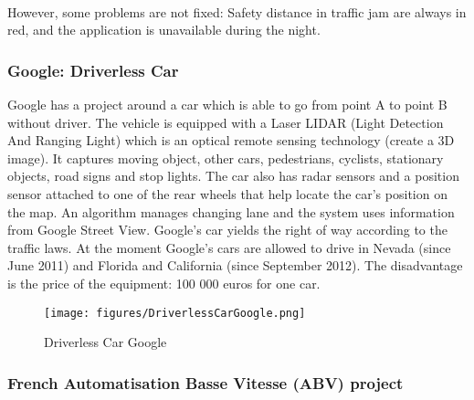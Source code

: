 \documentclass[a4paper]{article}
\begin{document}
\paragraph{}However, some problems are not fixed: Safety distance in traffic jam are always in red, and the application is unavailable during the night.

\subsubsection{Google: Driverless Car}

Google \cite{Google} has a project around a car which is able to go from point A to point B without driver. The vehicle is equipped with a Laser LIDAR (Light Detection And Ranging Light) which is an optical remote sensing technology (create a 3D image). It captures moving object, other cars, pedestrians, cyclists, stationary objects, road signs and stop lights. The car also has radar sensors and a position sensor attached to one of the rear wheels that help locate the car's position on the map. An algorithm manages changing lane and the system uses information from Google Street View. Google's car yields the right of way according to the traffic laws. At the moment Google's cars are allowed to drive in Nevada (since June 2011) and Florida and California (since September 2012). The disadvantage is the price of the equipment: 100 000 euros for one car.\begin{figure}[!htb]
\begin{center}
\texttt{[image: figures/DriverlessCarGoogle.png]}
\caption{Driverless Car Google}
\end{center}
\end{figure}

\subsubsection{French Automatisation Basse Vitesse (ABV) project}
\end{document}
